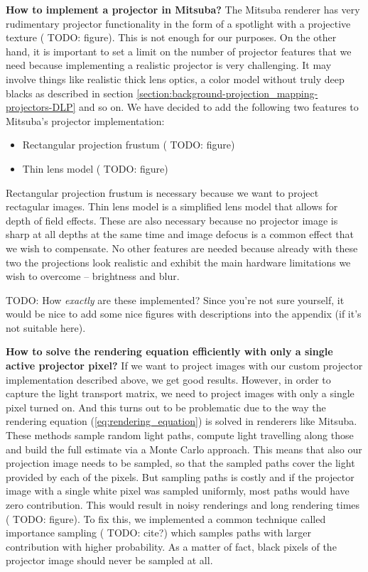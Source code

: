 \textbf{How to implement a projector in Mitsuba?} The Mitsuba renderer has very rudimentary projector functionality in the form of a spotlight with a projective texture ({\color{red} TODO: figure}). This is not enough for our purposes. On the other hand, it is important to set a limit on the number of projector features that we need because implementing a realistic projector is very challenging. It may involve things like realistic thick lens optics, a color model without truly deep blacks as described in section \ref{section:background-projection_mapping-projectors-DLP} and so on. We have decided to add the following two features to Mitsuba's projector implementation:

\begin{itemize}
    \item Rectangular projection frustum ({\color{red} TODO: figure})
    \item Thin lens model ({\color{red} TODO: figure})
\end{itemize}

Rectangular projection frustum is necessary because we want to project rectagular images. Thin lens model is a simplified lens model that allows for depth of field effects. These are also necessary because no projector image is sharp at all depths at the same time and image defocus is a common effect that we wish to compensate. No other features are needed because already with these two the projections look realistic and exhibit the main hardware limitations we wish to overcome -- brightness and blur.

{\color{red} TODO: How \textit{exactly} are these implemented? Since you're not sure yourself, it would be nice to add some nice figures with descriptions into the appendix (if it's not suitable here).}

\textbf{How to solve the rendering equation efficiently with only a single active projector pixel?} If we want to project images with our custom projector implementation described above, we get good results. However, in order to capture the light transport matrix, we need to project images with only a single pixel turned on. And this turns out to be problematic due to the way the rendering equation (\ref{eq:rendering_equation}) is solved in renderers like Mitsuba. These methods sample random light paths, compute light travelling along those and build the full estimate via a Monte Carlo approach. This means that also our projection image needs to be sampled, so that the sampled paths cover the light provided by each of the pixels. But sampling paths is costly and if the projector image with a single white pixel was sampled uniformly, most paths would have zero contribution. This would result in noisy renderings and long rendering times ({\color{red} TODO: figure}). To fix this, we implemented a common technique called importance sampling ({\color{red} TODO: cite?}) which samples paths with larger contribution with higher probability. As a matter of fact, black pixels of the projector image should never be sampled at all.

